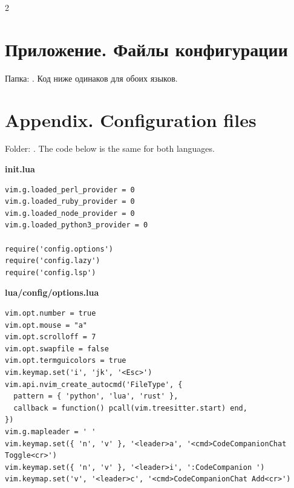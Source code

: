 \begin{paracol}{2}
\RU
\section*{Приложение. Файлы конфигурации}
Папка: . Код ниже одинаков для обоих языков.
\switchcolumn
\EN
\section*{Appendix. Configuration files}
Folder: . The code below is the same for both languages.
\end{paracol}

\wide
{}
\textbf{init.lua}
\begin{lstlisting}
vim.g.loaded_perl_provider = 0
vim.g.loaded_ruby_provider = 0
vim.g.loaded_node_provider = 0
vim.g.loaded_python3_provider = 0

require('config.options')
require('config.lazy')
require('config.lsp')
\end{lstlisting}

\textbf{lua/config/options.lua}
\begin{lstlisting}
vim.opt.number = true
vim.opt.mouse = "a"
vim.opt.scrolloff = 7
vim.opt.swapfile = false
vim.opt.termguicolors = true
vim.keymap.set('i', 'jk', '<Esc>')
vim.api.nvim_create_autocmd('FileType', {
  pattern = { 'python', 'lua', 'rust' },
  callback = function() pcall(vim.treesitter.start) end,
})
vim.g.mapleader = ' '
vim.keymap.set({ 'n', 'v' }, '<leader>a', '<cmd>CodeCompanionChat Toggle<cr>')
vim.keymap.set({ 'n', 'v' }, '<leader>i', ':CodeCompanion ')
vim.keymap.set('v', '<leader>c', '<cmd>CodeCompanionChat Add<cr>')
\end{lstlisting}

